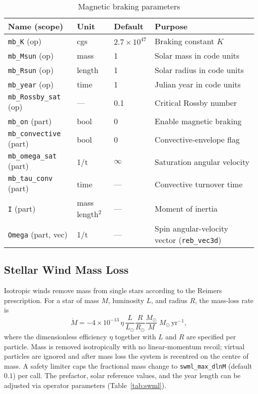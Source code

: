 \documentclass[11pt]{article}
\begin{document}
\begin{table}[h]
\centering\footnotesize
\caption{Magnetic braking parameters}
\label{tab:mb}
\begin{tabular}{@{}llll@{}}
\toprule
Name (scope) & Unit & Default & Purpose \\
\midrule
\texttt{mb\_K} (op) & cgs & $2.7\times10^{47}$ & Braking constant $K$\\
\texttt{mb\_Msun} (op) & mass & 1 & Solar mass in code units\\
\texttt{mb\_Rsun} (op) & length & 1 & Solar radius in code units\\
\texttt{mb\_year} (op) & time & 1 & Julian year in code units\\
\texttt{mb\_Rossby\_sat} (op) & — & 0.1 & Critical Rossby number\\
\texttt{mb\_on} (part) & bool & 0 & Enable magnetic braking\\
\texttt{mb\_convective} (part) & bool & 0 & Convective‑envelope flag\\
\texttt{mb\_omega\_sat} (part) & 1/t & $\infty$ & Saturation angular velocity\\
\texttt{mb\_tau\_conv} (part) & time & — & Convective turnover time\\
\texttt{I} (part) & mass\,length$^2$ & — & Moment of inertia\\
\texttt{Omega} (part, vec) & 1/t & — & Spin angular-velocity vector (\texttt{reb\_vec3d})\\
\bottomrule
\end{tabular}
\end{table}

\subsection{Stellar Wind Mass Loss}
\label{sec:swml}

Isotropic winds remove mass from single stars according to the
Reimers prescription. For a star of mass $M$, luminosity $L$, and radius
$R$, the mass-loss rate is
\[
\dot M = -4\times10^{-13}\,\eta\,\frac{L}{L_\odot}\frac{R}{R_\odot}\frac{M_\odot}{M}
\;M_\odot\,\mathrm{yr}^{-1},
\]
where the dimensionless efficiency $\eta$ together with $L$ and $R$ are
specified per particle. Mass is removed isotropically with no linear-momentum
recoil; virtual particles are ignored and after mass loss the system is
recentred on the centre of mass.  A safety limiter caps the fractional
mass change to \texttt{swml\_max\_dlnM} (default $0.1$) per call.  The
prefactor, solar reference values, and the year length can be adjusted via
operator parameters (Table~\ref{tab:swml}).
\end{document}
